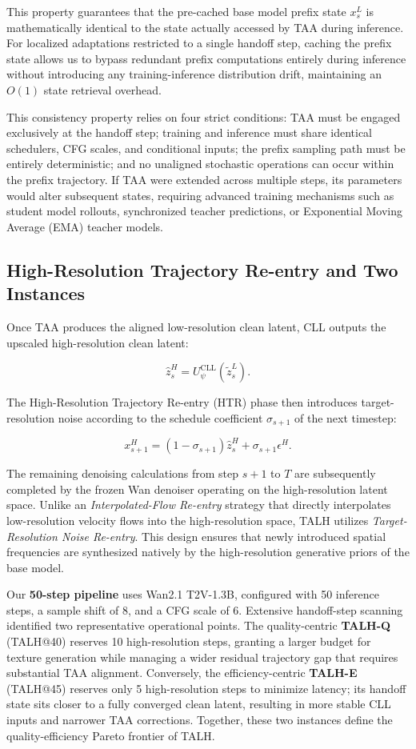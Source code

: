 This property guarantees that the pre-cached base model prefix state
\(x_s^L\) is mathematically identical to the state actually accessed by
TAA during inference. For localized adaptations restricted to a single
handoff step, caching the prefix state allows us to bypass redundant
prefix computations entirely during inference without introducing any
training-inference distribution drift, maintaining an \(O(1)\) state
retrieval overhead.

This consistency property relies on four strict conditions: TAA must be
engaged exclusively at the handoff step; training and inference must
share identical schedulers, CFG scales, and conditional inputs; the
prefix sampling path must be entirely deterministic; and no unaligned
stochastic operations can occur within the prefix trajectory. If TAA
were extended across multiple steps, its parameters would alter
subsequent states, requiring advanced training mechanisms such as
student model rollouts, synchronized teacher predictions, or Exponential
Moving Average (EMA) teacher models.

\subsection{High-Resolution Trajectory Re-entry and Two Instances}

Once TAA produces the aligned low-resolution clean latent, CLL outputs
the upscaled high-resolution clean latent:

\[
\widehat z_s^H=U_\psi^{\mathrm{CLL}}(\widetilde z_s^L).
\]

The High-Resolution Trajectory Re-entry (HTR) phase then introduces
target-resolution noise according to the schedule coefficient
\(\sigma_{s+1}\) of the next timestep:

\[
x_{s+1}^H
=(1-\sigma_{s+1})\widehat z_s^H
+\sigma_{s+1}\epsilon^H.
\]

The remaining denoising calculations from step \(s+1\) to \(T\) are
subsequently completed by the frozen Wan denoiser operating on the
high-resolution latent space. Unlike an \emph{Interpolated-Flow
Re-entry} strategy that directly interpolates low-resolution velocity
flows into the high-resolution space, TALH utilizes
\emph{Target-Resolution Noise Re-entry}. This design ensures that newly
introduced spatial frequencies are synthesized natively by the
high-resolution generative priors of the base model.

Our \textbf{50-step pipeline} uses Wan2.1 T2V-1.3B, configured with 50
inference steps, a sample shift of 8, and a CFG scale of 6. Extensive
handoff-step scanning identified two representative operational points.
The quality-centric \textbf{TALH-Q} (TALH@40) reserves 10
high-resolution steps, granting a larger budget for texture generation
while managing a wider residual trajectory gap that requires substantial
TAA alignment. Conversely, the efficiency-centric \textbf{TALH-E}
(TALH@45) reserves only 5 high-resolution steps to minimize latency; its
handoff state sits closer to a fully converged clean latent, resulting
in more stable CLL inputs and narrower TAA corrections. Together, these
two instances define the quality-efficiency Pareto frontier of TALH.

